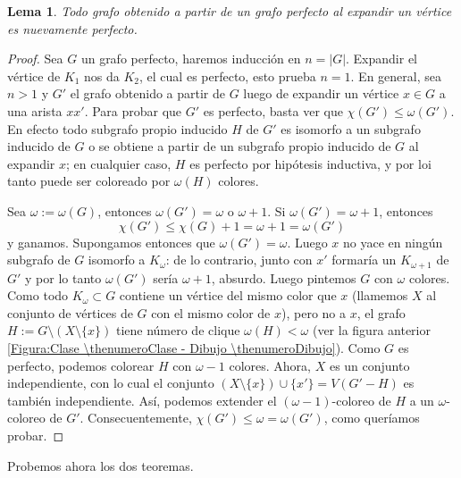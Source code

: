 \documentclass[12pt]{report}
\theoremstyle{plain}
\newtheorem{lemma}[theorem]{Lema}
\theoremstyle{definition}
\newcommand{\abs}[1]{\left \vert #1 \right \vert}
\newcounter{numeroClase}%
\newcounter{numeroSeccion}[section]%
\newcounter{numeroDibujo}[numeroSeccion]
\begin{document}

\begin{lemma}\label{lema:la expansion de un grafo perfecto es perfecto}
Todo grafo obtenido a partir de un grafo perfecto al expandir un vértice es nuevamente perfecto.
\end{lemma}
\begin{proof}
Sea $G$ un grafo perfecto, haremos inducción en $n = \abs G$. Expandir el vértice de $K_1$ nos da $K_2$, el cual es perfecto, esto prueba $n = 1$. En general, sea $n >1$ y $G'$ el grafo obtenido a partir de $G$ luego de expandir un vértice $x \in G$ a una arista $xx'$. Para probar que $G'$ es perfecto, basta ver que $\chi (G') \leq \omega (G')$. En efecto todo subgrafo propio inducido $H$ de $G'$ es isomorfo a un subgrafo inducido de $G$ o se obtiene a partir de un subgrafo propio inducido de $G$ al expandir $x$; en cualquier caso, $H$ es perfecto por hipótesis inductiva, y por loi tanto puede ser coloreado por $\omega (H) $ colores.

Sea $\omega := \omega (G)$, entonces $\omega (G') = \omega$ o $\omega + 1$. Si $\omega (G') = \omega + 1$, entonces
\[
    \chi (G') \leq \chi (G) + 1 = \omega + 1 = \omega (G')
\]
y ganamos. Supongamos entonces que $\omega (G') = \omega$. Luego $x$ no yace en ningún subgrafo de $G$ isomorfo a $K_\omega$: de lo contrario, junto con $x'$ formaría un $K_{\omega + 1}$ de $G'$ y por lo tanto $\omega (G')$ sería $\omega + 1$, absurdo. Luego pintemos $G$ con $\omega$ colores. Como todo $K_\omega \subset G$ contiene un vértice del mismo color que $x$ (llamemos $X$ al conjunto de vértices de $G$ con el mismo color de $x$), pero no a $x$, el grafo $H:= G \setminus (X \setminus \{x\})$ tiene número de clique $\omega (H) < \omega$ (ver la figura anterior \ref{Figura:Clase \thenumeroClase - Dibujo \thenumeroDibujo}). Como $G$ es perfecto, podemos colorear $H$ con $\omega -1$ colores. Ahora, $X$ es un conjunto independiente, con lo cual el conjunto $(X \setminus \{x\}) \cup  \{x'\} = V(G' - H)$ es también independiente. Así, podemos extender el $(\omega -1)$-coloreo de $H$ a un $\omega$-coloreo de $G'$. Consecuentemente, $\chi (G') \leq \omega = \omega (G')$, como queríamos probar.
\end{proof}

Probemos ahora los dos teoremas.
\end{document}
